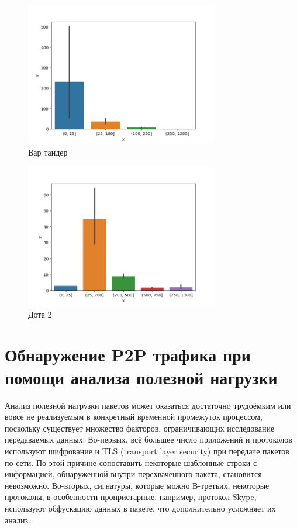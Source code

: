 \documentclass[bachelor, och, coursework]{SCWorks}
\begin{document}
\begin{figure}[H]
    \centering
    \includegraphics[width=0.75\textwidth]{warthunder.png}
    \caption{Вар тандер}
    \label{wt}
\end{figure}

\begin{figure}[H]
    \centering
    \includegraphics[width=0.75\textwidth]{dota2.png}
    \caption{Дота 2}
    \label{dota2}
\end{figure}


\section{Обнаружение P2P трафика при помощи анализа полезной нагрузки}
Анализ полезной нагрузки пакетов может оказаться достаточно трудоёмким или вовсе не реализуемым в конкретный временной промежуток процессом, поскольку существует множество факторов, ограничивающих исследование передаваемых данных. Во-первых, всё большее число приложений и протоколов используют шифрование и TLS (transport layer security) при передаче пакетов по сети. По этой причине сопоставить некоторые шаблонные строки с информацией, обнаруженной внутри перехваченного пакета, становится невозможно. Во-вторых, сигнатуры, которые можно  В-третьих, некоторые протоколы, в особенности проприетарные, например, протокол Skype, используют обфускацию данных в пакете, что дополнительно усложняет их анализ. 
\end{document}
